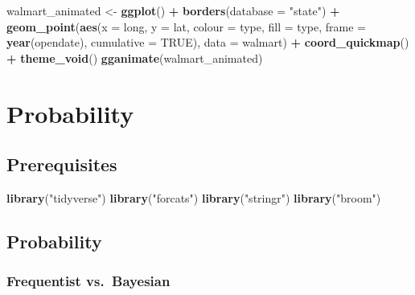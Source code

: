 \documentclass[]{book}
\newenvironment{Shaded}{\begin{snugshade}}{\end{snugshade}}
\newcommand{\KeywordTok}[1]{\textcolor[rgb]{0.13,0.29,0.53}{\textbf{#1}}}
\newcommand{\DataTypeTok}[1]{\textcolor[rgb]{0.13,0.29,0.53}{#1}}
\newcommand{\StringTok}[1]{\textcolor[rgb]{0.31,0.60,0.02}{#1}}
\newcommand{\OtherTok}[1]{\textcolor[rgb]{0.56,0.35,0.01}{#1}}
\newcommand{\OperatorTok}[1]{\textcolor[rgb]{0.81,0.36,0.00}{\textbf{#1}}}
\newcommand{\NormalTok}[1]{#1}
\theoremstyle{definition}
\theoremstyle{definition}
\theoremstyle{definition}
\theoremstyle{remark}
\begin{document}
\begin{Shaded}
\begin{Highlighting}[]
\NormalTok{walmart_animated <-}
\StringTok{  }\KeywordTok{ggplot}\NormalTok{() }\OperatorTok{+}
\StringTok{    }\KeywordTok{borders}\NormalTok{(}\DataTypeTok{database =} \StringTok{"state"}\NormalTok{) }\OperatorTok{+}
\StringTok{    }\KeywordTok{geom_point}\NormalTok{(}\KeywordTok{aes}\NormalTok{(}\DataTypeTok{x =}\NormalTok{ long, }\DataTypeTok{y =}\NormalTok{ lat,}
                   \DataTypeTok{colour =}\NormalTok{ type,}
                   \DataTypeTok{fill =}\NormalTok{ type,}
                   \DataTypeTok{frame =} \KeywordTok{year}\NormalTok{(opendate),}
                   \DataTypeTok{cumulative =} \OtherTok{TRUE}\NormalTok{),}
               \DataTypeTok{data =}\NormalTok{ walmart) }\OperatorTok{+}
\StringTok{    }\KeywordTok{coord_quickmap}\NormalTok{() }\OperatorTok{+}
\StringTok{    }\KeywordTok{theme_void}\NormalTok{()}
\KeywordTok{gganimate}\NormalTok{(walmart_animated)}
\end{Highlighting}
\end{Shaded}

\chapter{Probability}\label{probability}

\section*{Prerequisites}\label{prerequisites-7}

\begin{Shaded}
\begin{Highlighting}[]
\KeywordTok{library}\NormalTok{(}\StringTok{"tidyverse"}\NormalTok{)}
\KeywordTok{library}\NormalTok{(}\StringTok{"forcats"}\NormalTok{)}
\KeywordTok{library}\NormalTok{(}\StringTok{"stringr"}\NormalTok{)}
\KeywordTok{library}\NormalTok{(}\StringTok{"broom"}\NormalTok{)}
\end{Highlighting}
\end{Shaded}

\section{Probability}\label{probability-1}

\subsection{Frequentist vs.~Bayesian}\label{frequentist-vs.bayesian}
\end{document}
